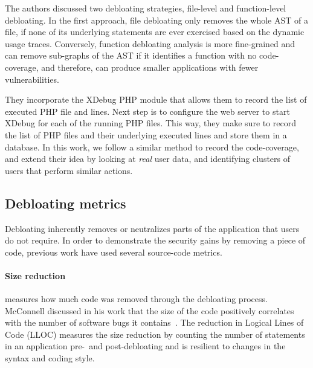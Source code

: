 The authors discussed two debloating strategies, file-level and function-level debloating. 
In the first approach, file debloating only removes the whole AST of a file, if none of its underlying statements are ever exercised based on the dynamic usage traces. 
Conversely, function debloating analysis is more fine-grained and can remove sub-graphs of the AST if it identifies a function with no code-coverage, and therefore, can produce smaller applications with fewer vulnerabilities. 

%
They incorporate the XDebug PHP module that allows them to record the list of executed PHP file and lines. 
Next step is to configure the web server to start XDebug for each of the running PHP files. 
This way, they make sure to record the list of PHP files and their underlying executed lines and store them in a database. 
In this work, we follow a similar method to record the code-coverage, and extend their idea by looking at \emph{real} user data, and identifying clusters of users that perform similar actions. 

\subsection{Debloating metrics}

Debloating inherently removes or neutralizes parts of the application that users do not require. 
In order to demonstrate the security gains by removing a piece of code, previous work have used several source-code metrics. 

\paragraph{Size reduction} measures how much code was removed through the debloating process. 
McConnell discussed in his work that the size of the code positively correlates with the number of software bugs it contains~\cite{mcconnell2004code}. The reduction in Logical Lines of Code (LLOC) measures the size reduction by counting the number of statements in an application pre-~and post-debloating and is resilient to changes in the syntax and coding style.

